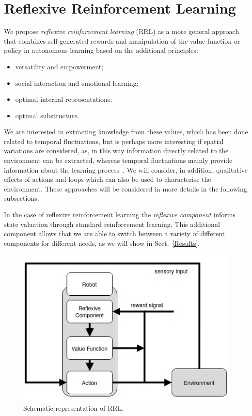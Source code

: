 \documentclass{article}
\begin{document}
\section{Reflexive Reinforcement Learning}
We propose \emph{reflexive reinforcement learning} (RRL) as a more general approach that combines self-generated rewards and manipulation of the
value function or policy in autonomous learning based on the additional principles:
\begin{itemize}
\item versatility and empowerment;
\item social interaction and emotional learning;
\item optimal internal representations;
\item optimal substructure.
\end{itemize}

We are interested in extracting knowledge from these values, which has been done
related to temporal fluctuations, but %
is perhaps more interesting if spatial variations are considered, as, in this way information directly
related to the environment can be extracted, whereas temporal fluctuations mainly provide
information about the learning process~\citep{herrmann1995efficient}. We will consider, in addition, qualitative effects of actions and loops which can also be used to characterise the environment. These approaches will be considered in more details 
in the following subsections.
\cite{balakrishnan2019incorporating}

In the case of reflexive reinforcement learning the \emph{reflexive component} informs state valuation through standard reinforcement learning. This additional component allows that we are able to switch between a variety of different components for different needs, as we will show in Sect.~\ref{Results}.

\begin{figure}[ht] 
\centering
\includegraphics[scale=0.40]{pics/RRLfig.jpg} 
	\caption{Schematic representation of RRL.\label{rrlfig}}
\end{figure}
\end{document}
